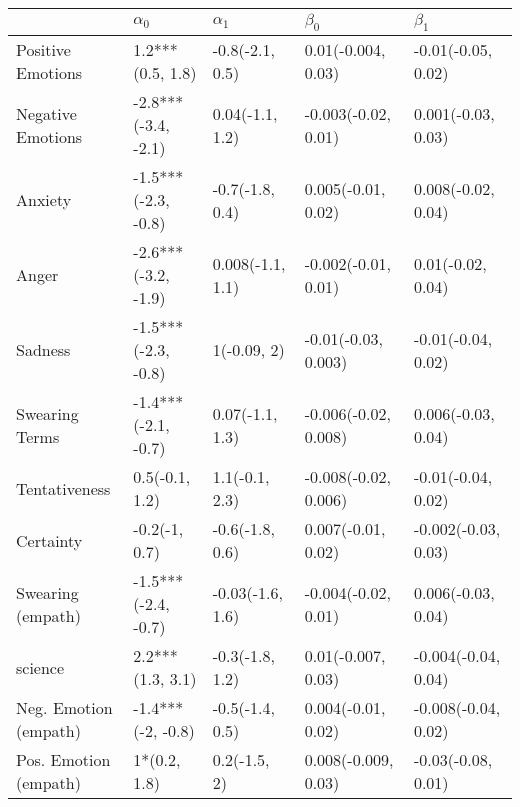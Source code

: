 \begin{tabular}{lllll}
\toprule
{} &           $\alpha_0$ &        $\alpha_1$ &             $\beta_0$ &            $\beta_1$ \\
\midrule
Positive Emotions     &     1.2***(0.5, 1.8) &   -0.8(-2.1, 0.5) &    0.01(-0.004, 0.03) &   -0.01(-0.05, 0.02) \\
Negative Emotions     &  -2.8***(-3.4, -2.1) &   0.04(-1.1, 1.2) &   -0.003(-0.02, 0.01) &   0.001(-0.03, 0.03) \\
Anxiety               &  -1.5***(-2.3, -0.8) &   -0.7(-1.8, 0.4) &    0.005(-0.01, 0.02) &   0.008(-0.02, 0.04) \\
Anger                 &  -2.6***(-3.2, -1.9) &  0.008(-1.1, 1.1) &   -0.002(-0.01, 0.01) &    0.01(-0.02, 0.04) \\
Sadness               &  -1.5***(-2.3, -0.8) &       1(-0.09, 2) &   -0.01(-0.03, 0.003) &   -0.01(-0.04, 0.02) \\
Swearing Terms        &  -1.4***(-2.1, -0.7) &   0.07(-1.1, 1.3) &  -0.006(-0.02, 0.008) &   0.006(-0.03, 0.04) \\
Tentativeness         &       0.5(-0.1, 1.2) &    1.1(-0.1, 2.3) &  -0.008(-0.02, 0.006) &   -0.01(-0.04, 0.02) \\
Certainty             &        -0.2(-1, 0.7) &   -0.6(-1.8, 0.6) &    0.007(-0.01, 0.02) &  -0.002(-0.03, 0.03) \\
Swearing (empath)     &  -1.5***(-2.4, -0.7) &  -0.03(-1.6, 1.6) &   -0.004(-0.02, 0.01) &   0.006(-0.03, 0.04) \\
science               &     2.2***(1.3, 3.1) &   -0.3(-1.8, 1.2) &    0.01(-0.007, 0.03) &  -0.004(-0.04, 0.04) \\
Neg. Emotion (empath) &    -1.4***(-2, -0.8) &   -0.5(-1.4, 0.5) &    0.004(-0.01, 0.02) &  -0.008(-0.04, 0.02) \\
Pos. Emotion (empath) &         1*(0.2, 1.8) &      0.2(-1.5, 2) &   0.008(-0.009, 0.03) &   -0.03(-0.08, 0.01) \\
\bottomrule
\end{tabular}
